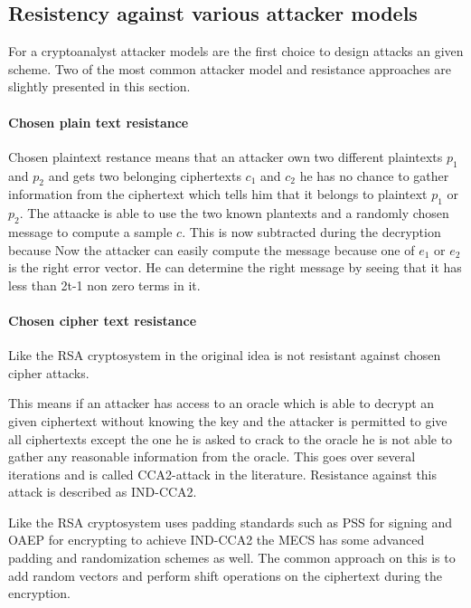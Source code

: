\subsection*{Resistency against various attacker models}
For a cryptoanalyst attacker models are the first choice to design attacks an given scheme. Two of the most common attacker model and resistance approaches are slightly presented in this section.

\paragraph*{Chosen plain text resistance}
Chosen plaintext restance means that an attacker own two different plaintexts $p_1$ and $p_2$ and gets two belonging ciphertexts $c_1$ and $c_2$ he has no chance to gather information from the ciphertext which tells him that it belongs to plaintext $p_1$ or $p_2$.
The attaacke is able to use the two known plantexts and a randomly chosen message to compute a sample $c$. This is now subtracted during the decryption because
Now the attacker can easily compute the message because one of $e_1$ or $e_2$ is the right error vector. He can determine the right message by seeing that it has less than 2t-1 non zero terms in it.


\paragraph*{Chosen cipher text resistance}
Like the RSA cryptosystem in the original idea is not resistant against chosen cipher attacks. 

This means if an attacker has access to an oracle which is able to decrypt an given ciphertext without knowing the key and the attacker is permitted to give all ciphertexts except the one he is asked to crack to the oracle he is not able to gather any reasonable information from the oracle. This goes over several iterations and is called CCA2-attack in the literature. Resistance against this attack is described as IND-CCA2. 

Like the RSA cryptosystem uses padding standards such as PSS for signing and OAEP for encrypting to achieve IND-CCA2 the MECS has some advanced padding and randomization schemes as well. The common approach on this is to add  random vectors and perform shift operations on the ciphertext during the encryption\cite{dottling2012cca2}. 

